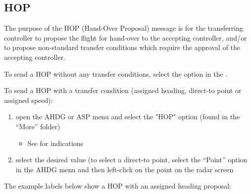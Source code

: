 \documentclass[a4paper,oneside,11pt]{memoir}
\begin{document}
\subsection{HOP}
\label{coo:hop}
The purpose of the HOP (Hand-Over Proposal) message is for the transferring controller to propose the flight for hand-over to the accepting controller, and/or to propose non-standard transfer conditions which require the approval of the accepting controller.

\bigskip

To send a HOP without any transfer conditions, select the  option in the .

\bigskip

To send a HOP with a transfer condition (assigned heading, direct-to point or assigned speed):

\begin{enumerate}
  \item open the AHDG or ASP menu and select the "HOP" option (found in the “More” folder)
  \begin{itemize}
    \item See  for indications
  \end{itemize}
  \item select the desired value (to select a direct-to point, select the “Point” option in the AHDG menu and then left-click on the point on the radar screen
\end{enumerate}

The example labels below show a HOP with an assigned heading proposal:
\end{document}
